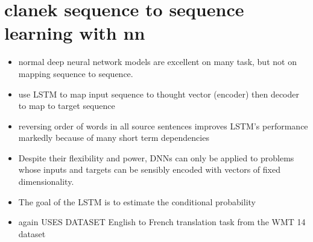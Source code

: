 \section{clanek sequence to sequence learning with nn}
\begin{itemize}
  \item normal deep neural network models are excellent on many task, but not on mapping sequence to sequence.
  \item use LSTM to map input sequence to thought vector (encoder) then decoder to map to target sequence
  \item reversing order of words in all source sentences improves LSTM's performance markedly because of many short term dependencies
  \item Despite their flexibility and power, DNNs can only be applied to problems whose inputs and targets can be sensibly encoded with vectors of fixed dimensionality.
  \item The goal of the LSTM is to estimate the conditional probability
  \item again USES DATASET English to French translation task from the WMT 14 dataset

\end{itemize}

